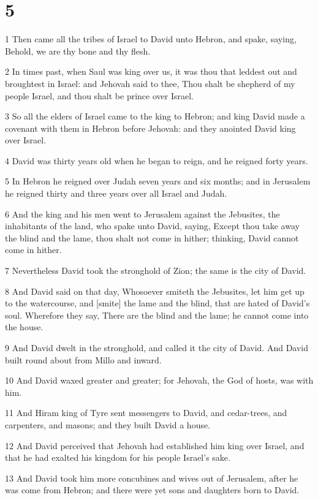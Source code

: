 \chapter{5}

\par 1 Then came all the tribes of Israel to David unto Hebron, and spake, saying, Behold, we are thy bone and thy flesh.
\par 2 In times past, when Saul was king over us, it was thou that leddest out and broughtest in Israel: and Jehovah said to thee, Thou shalt be shepherd of my people Israel, and thou shalt be prince over Israel.
\par 3 So all the elders of Israel came to the king to Hebron; and king David made a covenant with them in Hebron before Jehovah: and they anointed David king over Israel.
\par 4 David was thirty years old when he began to reign, and he reigned forty years.
\par 5 In Hebron he reigned over Judah seven years and six months; and in Jerusalem he reigned thirty and three years over all Israel and Judah.
\par 6 And the king and his men went to Jerusalem against the Jebusites, the inhabitants of the land, who spake unto David, saying, Except thou take away the blind and the lame, thou shalt not come in hither; thinking, David cannot come in hither.
\par 7 Nevertheless David took the stronghold of Zion; the same is the city of David.
\par 8 And David said on that day, Whosoever smiteth the Jebusites, let him get up to the watercourse, and [smite] the lame and the blind, that are hated of David's soul. Wherefore they say, There are the blind and the lame; he cannot come into the house.
\par 9 And David dwelt in the stronghold, and called it the city of David. And David built round about from Millo and inward.
\par 10 And David waxed greater and greater; for Jehovah, the God of hosts, was with him.
\par 11 And Hiram king of Tyre sent messengers to David, and cedar-trees, and carpenters, and masons; and they built David a house.
\par 12 And David perceived that Jehovah had established him king over Israel, and that he had exalted his kingdom for his people Israel's sake.
\par 13 And David took him more concubines and wives out of Jerusalem, after he was come from Hebron; and there were yet sons and daughters born to David.
